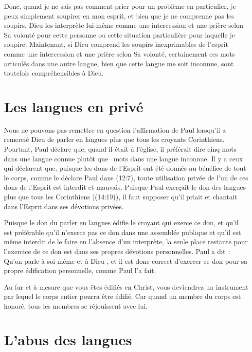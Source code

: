 Donc, quand je ne sais pas comment prier pour un problème en particulier,
 je peux simplement soupirer en mon esprit, et bien que je ne comprenne pas
 les soupirs, Dieu les interprète lui-même comme une intercession
 et une prière selon Sa volonté pour cette personne ou cette situation
 particulière pour laquelle je soupire. Maintenant, si Dieu comprend
 les soupirs inexprimables de l'esprit comme une intercession
 et une prière selon Sa volonté, certainement ces mots articulés
 dans une autre langue, bien que cette langue me soit inconnue,
 sont toutefois compréhensibles à Dieu.


\section*{Les langues en privé}

\begin{specialpar}{}
Nous ne pouvons pas remettre en question l'affirmation de Paul lorsqu'il
 a remercié Dieu de parler en langues plus que tous les croyants Corinthiens.
 Pourtant, Paul déclare que, quand il était à l'église, il préférait dire
 cinq mots dans une langue connue plutôt que ~mots
 dans une langue inconnue. Il y a ceux qui déclarent que, puisque les dons
 de l'Esprit ont été donnés au bénéfice de tout le corps, comme le déclare
 Paul dans (12:7), toute utilisation privée
 de l'un de ces dons de l'Esprit est interdit et mauvais.
 Puisque Paul exerçait le don des langues plus que tous les Corinthiens
 ((14:19)), il faut supposer qu'il priait et chantait
 dans l'Esprit dans ses dévotions privées.
\end{specialpar}

Puisque le don du parler en langues édifie le croyant qui exerce ce don,
 et qu'il est préférable qu'il n'exerce pas ce don dans une assemblée publique
 et qu'il est même interdit de le faire en l'absence d'un interprète,
 la seule place restante pour l'exercice de ce don est dans ses propres
 dévotions personnelles. Paul a dit~:
 \og Qu'on parle à soi-même et à Dieu \fg{}, et il est donc correct
 d'exercer ce don pour sa propre édification personnelle, comme Paul l'a fait.

Au fur et à mesure que vous êtes édifiés en Christ, vous deviendrez
 un instrument par lequel le corps entier pourra être édifié.
 Car quand un membre du corps est honoré, tous les membres
 se réjouissent avec lui.


\section*{L'abus des langues}

